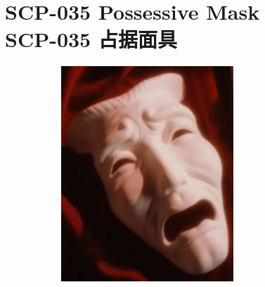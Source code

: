 \chapter[SCP-035 占据面具]{
    SCP-035 Possessive Mask\\
    SCP-035 占据面具
}

\label{chap:SCP-035}

\begin{figure}[H]
    \centering
    \begin{subfigure}[b]{0.4\textwidth}
        \centering
        \includegraphics[width=\linewidth]{images/SCP-035-0.png}
    \end{subfigure}
    \begin{subfigure}[b]{0.4\textwidth}
        \centering

\end{subfigure}
\end{figure}
